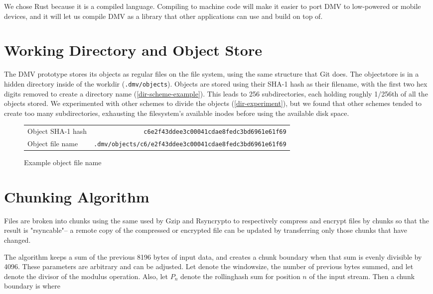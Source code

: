 We chose Rust because it is a compiled language. Compiling to machine code will
make it easier to port DMV to low-powered or mobile devices, and it will let us
compile DMV as a library that other applications can use and build on top of.


\section{Working Directory and Object Store}\label{dir-impl}

The \gls{DMV} prototype stores its objects as regular files on the file system,
using the same structure that Git does. The \gls{objectstore} is in a hidden
directory inside of the \gls{workdir} (\lstinline{.dmv/objects}). Objects are
stored using their SHA-1 hash as their filename, with the first two hex digits
removed to create a directory name (\autoref{dir-scheme-example}). This leads to
\num{256} subdirectories, each holding roughly \num{1/256}th of all the objects
stored. We experimented with other schemes to divide the objects
(\autoref{dir-experiment}), but we found that other schemes tended to create too
many subdirectories, exhausting the filesystem's available \glspl{inode} before
using the available disk space.

\begin{figure}[h]
    \caption{Example object file name}
    \label{dir-scheme-example}
    \begin{tabular}{ l r }
        Object SHA-1 hash & \lstinline{c6e2f43ddee3c00041cdae8fedc3bd6961e61f69} \\
        Object file name & \lstinline{.dmv/objects/c6/e2f43ddee3c00041cdae8fedc3bd6961e61f69} \\
    \end{tabular}
\end{figure}

%


\section{Chunking Algorithm}\label{chunking-algorithm}

Files are broken into chunks using the same  used by Gzip
and Rsyncrypto\cite{rsyncrypto_algorithm} to respectively compress and encrypt
files by chunks so that the result is "rsyncable"-- a remote copy of the
compressed or encrypted file can be updated by transferring only those chunks
that have changed.

The algorithm keeps a sum of the previous \num{8196} bytes of input data, and
creates a chunk boundary when that sum is evenly divisible by \num{4096}. These
parameters are arbitrary and can be adjusted. Let  denote
the \gls{windowsize}, the number of previous bytes summed, and let
 denote the \gls{divisor} of the modulus operation. Also, let
$P_n$ denote the \gls{rollinghash} sum for position $n$ of the input stream.
Then a chunk boundary is where

